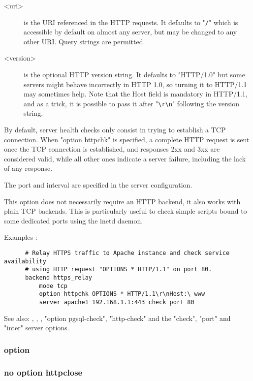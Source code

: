 {\begin{description}
\item[<uri>]     is the URI referenced in the HTTP requests. It defaults to "\verb|/|"
              which is accessible by default on almost any server, but may be
              changed to any other URI. Query strings are permitted.

\item[<version>] is the optional HTTP version string. It defaults to "HTTP/1.0"
              but some servers might behave incorrectly in HTTP 1.0, so turning
              it to HTTP/1.1 may sometimes help. Note that the Host field is
              mandatory in HTTP/1.1, and as a trick, it is possible to pass it
              after "\verb|\r\n|" following the version string.
\end{description}

  By default, server health checks only consist in trying to establish a TCP
  connection. When "option httpchk" is specified, a complete HTTP request is
  sent once the TCP connection is established, and responses 2xx and 3xx are
  considered valid, while all other ones indicate a server failure, including
  the lack of any response.

  The port and interval are specified in the server configuration.

  This option does not necessarily require an HTTP backend, it also works with
  plain TCP backends. This is particularly useful to check simple scripts bound
  to some dedicated ports using the inetd daemon.

  Examples :
\begin{verbatim}
      # Relay HTTPS traffic to Apache instance and check service availability
      # using HTTP request "OPTIONS * HTTP/1.1" on port 80.
      backend https_relay
          mode tcp
          option httpchk OPTIONS * HTTP/1.1\r\nHost:\ www
          server apache1 192.168.1.1:443 check port 80
\end{verbatim}

  See also: , , ,
             "option pgsql-check", "http-check" and the "check", "port" and
             "inter" server options.

\subsubsection[httpclose]{option }
\subsubsection*{no option httpclose}

}
